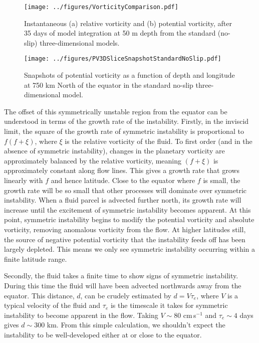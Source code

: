 \begin{figure}[p]
    \centering
    \texttt{[image: ../figures/VorticityComparison.pdf]}
    \caption{Instantaneous (a) relative vorticity and (b) potential vorticity, after 35 days of model integration at 50 m depth from the standard (no-slip) three-dimensional models.}
    \label{fig:EddyRelativeAndAbsoluteVorticity}
\end{figure}

\begin{figure}[t]
    \centering
    \texttt{[image: ../figures/PV3DSliceSnapshotStandardNoSlip.pdf]}
    \caption{Snapshots of potential vorticity as a function of depth and longitude at 750 km  North of the equator in the standard no-slip three-dimensional model.}
    \label{fig:PVatFixedLatStandardNoSlip3D}
\end{figure}

The offset of this symmetrically unstable region from the equator can be understood in terms of the growth rate of the instability. Firstly, in the inviscid limit, the square of the growth rate of symmetric instability is proportional to $f(f + \xi)$, where $\xi$ is the relative vorticity of the fluid. To first order (and in the absence of symmetric instability), changes in the planetary vorticity are approximately balanced by the relative vorticity, meaning $(f + \xi)$ is approximately constant along flow lines. This gives a growth rate that grows linearly with $f$ and hence latitude. Close to the equator where $f$ is small, the growth rate will be so small that other processes will dominate over symmetric instability. When a fluid parcel is advected further north, its growth rate will increase until the excitement of symmetric instability becomes apparent. At this point, symmetric instability begins to modify the potential vorticity and absolute vorticity, removing anomalous vorticity from the flow. At higher latitudes still, the source of negative potential vorticity that the instability feeds off has been largely depleted. This means we only see symmetric instability occurring within a finite latitude range.

Secondly, the fluid takes a finite time to show signs of symmetric instability. During this time the fluid will have been advected northwards away from the equator. This distance, $d$, can be crudely estimated by $d = V \tau_e$, where $V$ is a typical velocity of the fluid and $\tau_e$ is the timescale it takes for symmetric instability to become apparent in the flow. Taking $V\sim 80$ cm\,s$^{-1}$ and $\tau_e \sim 4$ days gives $d \sim 300$ km. From this simple calculation, we shouldn't expect the instability to be well-developed either at or close to the equator.

